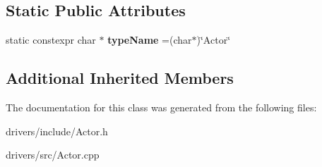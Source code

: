 \subsection*{Static Public Attributes}
\begin{DoxyCompactItemize}
\item 
\hypertarget{classActor_a9499766a969b46ad8336d5ae00712fa2}{}static constexpr char $\ast$ {\bfseries type\+Name} =(char$\ast$)\char`\"{}Actor\char`\"{}\label{classActor_a9499766a969b46ad8336d5ae00712fa2}

\end{DoxyCompactItemize}
\subsection*{Additional Inherited Members}


The documentation for this class was generated from the following files\+:\begin{DoxyCompactItemize}
\item 
drivers/include/Actor.\+h\item 
drivers/src/Actor.\+cpp\end{DoxyCompactItemize}
